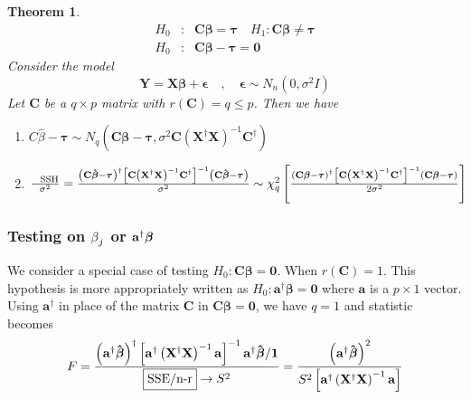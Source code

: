 \documentclass{article}
\newtheorem{theorem}{Theorem}
\begin{document}
\begin{theorem}
\begin{eqnarray*}
H_{0} &:&\mathbf{C\beta =\tau }\quad H_{1}:\mathbf{C\beta \neq \tau } \\
H_{0} &:&\mathbf{C\beta -\tau =0}
\end{eqnarray*}%
\newline
Consider the model%
\begin{equation*}
\mathbf{Y=X\beta +\epsilon \quad ,\quad \epsilon }\sim N_{n}\left( 0,\sigma
^{2}I\right)
\end{equation*}%
\newline
Let $\mathbf{C}$ be a $q\times p$ matrix with $r\left( \mathbf{C}\right)
=q\leq p$. Then we have

\begin{enumerate}
\item $C\hat{\beta}-\mathbf{\tau }\sim N_{q}\left( \mathbf{C\beta -\tau }%
,\sigma ^{2}\mathbf{C}\left( \mathbf{X}^{\dagger }\mathbf{X}\right) ^{-1}%
\mathbf{C}^{\dagger }\right) $

\item $\frac{\text{SSH}}{\sigma ^{2}}=\frac{\left( \mathbf{C\hat{\beta}-\tau 
}\right) ^{\dagger }\left[ \mathbf{C}\left( \mathbf{X}^{\dagger }\mathbf{X}%
\right) ^{-1}\mathbf{C}^{\dagger }\right] ^{-1}\left( \mathbf{C\hat{\beta}%
-\tau }\right) }{\sigma ^{2}}\sim \chi _{q}^{2}\left[ \frac{\left( \mathbf{%
C\beta -\tau }\right) ^{\dagger }\left[ \mathbf{C}\left( \mathbf{X}^{\dagger
}\mathbf{X}\right) ^{-1}\mathbf{C}^{\dagger }\right] ^{-1}\left( \mathbf{%
C\beta -\tau }\right) }{2\sigma ^{2}}\right] $
\end{enumerate}
\end{theorem}

\bigskip

\subsubsection{Testing on $\protect\beta _{j}$ or $\mathbf{a}^{\dagger }%
\mathbf{\protect\beta }$}

We consider a special case of testing $H_{0}:\mathbf{C\beta =0}$. When $%
r\left( \mathbf{C}\right) =1$. This hypothesis is more appropriately written
as $H_{0}:\mathbf{a}^{\dagger }\mathbf{\beta =0}$ where $\mathbf{a}$ is a $%
p\times 1$ vector. Using $\mathbf{a}^{\dagger }$ in place of the matrix $%
\mathbf{C}$ in $\mathbf{C\beta =0}$, we have $q=1$ and statistic becomes%
\begin{equation*}
F=\frac{\left( \mathbf{a}^{\dagger }\mathbf{\hat{\beta}}\right) ^{\dagger }%
\left[ \mathbf{a}^{\dagger }\left( \mathbf{X}^{\dagger }\mathbf{X}\right)
^{-1}\mathbf{a}\right] ^{-1}\mathbf{a}^{\dagger }\mathbf{\hat{\beta}/1}}{%
\fbox{SSE/n-r}\rightarrow S^{2}}=\frac{\left( \mathbf{a}^{\dagger }\mathbf{%
\hat{\beta}}\right) ^{2}}{S^{2}\left[ \mathbf{a}^{\dagger }\left( \mathbf{X}%
^{\dagger }\mathbf{X}\right) ^{-1}\mathbf{a}\right] }
\end{equation*}
\end{document}
